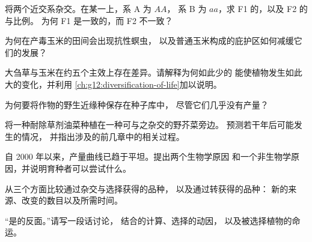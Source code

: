 \begin{exercise}[$\star\star$]\label{exo:g12:domesticated-plants:8}
将两个近交系杂交。在某一上，系 A 为 $AA$，
系 B 为 $aa$，求 F1 的，以及 F2 的与比例。
为何 F1 是一致的，而 F2 不一致？
\end{exercise}

\begin{exercise}[$\star\star$]\label{exo:g12:domesticated-plants:9}
为何在产毒玉米的田间会出现抗性螟虫，
以及普通玉米构成的庇护区如何减缓它们的发展？
\end{exercise}

\begin{exercise}[$\star\star$]\label{exo:g12:domesticated-plants:10}
大刍草与玉米在约五个主效上存在差异。请解释为何如此少的
能使植物发生如此大的变化，并利用
\cref{ch:g12:diversification-of-life}加以说明。
\end{exercise}

\begin{exercise}[$\star\star$]\label{exo:g12:domesticated-plants:11}
为何要将作物的野生近缘种保存在种子库中，
尽管它们几乎没有产量？
\end{exercise}

\begin{exercise}[$\star\star\star$]\label{exo:g12:domesticated-plants:12}
将一种耐除草剂油菜种植在一种可与之杂交的野芥菜旁边。
预测若干年后可能发生的情况，
并指出涉及的前几章中的相关过程。
\end{exercise}

\begin{exercise}[$\star\star\star$]\label{exo:g12:domesticated-plants:13}
自 2000 年以来，产量曲线已趋于平坦。提出两个生物学原因
和一个非生物学原因，并说明育种者可以尝试什么。
\end{exercise}

\begin{exercise}[$\star\star\star$]\label{exo:g12:domesticated-plants:14}
从三个方面比较通过杂交与选择获得的品种，
以及通过转获得的品种：
新的来源、改变的数目以及所需时间。
\end{exercise}

\begin{exercise}[$\star\star\star$]\label{exo:g12:domesticated-plants:15}
“是的反面。”请写一段话讨论，
结合的计算、选择的动因，
以及被选择植物的命运。
\end{exercise}

